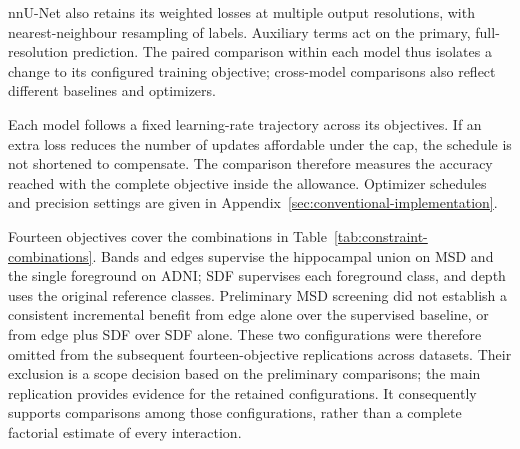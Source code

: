 \documentclass[12pt,a4paper]{article}
\begin{document}
nnU-Net also retains its weighted losses at multiple output resolutions,
with nearest-neighbour resampling of labels. Auxiliary terms act on
the primary, full-resolution prediction. The paired comparison within
each model thus isolates a change to its configured training objective;
cross-model comparisons also reflect different baselines and optimizers.

Each model follows a fixed learning-rate trajectory across its
objectives. If an extra loss reduces the number of updates affordable
under the cap, the schedule is not shortened to compensate. The
comparison therefore measures the accuracy reached with the complete
objective inside the allowance. Optimizer schedules and precision
settings are given in Appendix~\ref{sec:conventional-implementation}.

Fourteen objectives cover the combinations in
Table~\ref{tab:constraint-combinations}. Bands and edges supervise
the hippocampal union on MSD and the single foreground on ADNI; SDF
supervises each foreground class, and depth
uses the original reference classes. Preliminary MSD screening did not
establish a consistent incremental benefit from edge alone over the
supervised baseline, or from edge plus SDF over SDF alone. These two
configurations were therefore omitted from the subsequent
fourteen-objective replications across datasets. Their exclusion is a
scope decision based on the preliminary comparisons; the main replication
provides evidence for the retained configurations. It consequently
supports comparisons among those configurations, rather than a complete
factorial estimate of every interaction.
\end{document}
